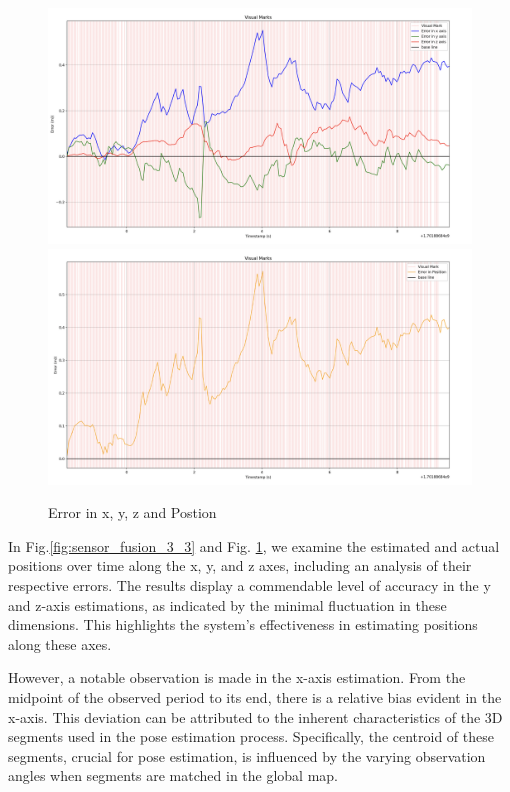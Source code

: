 \begin{figure}[H]
    \centering
    \includegraphics[width=.8\linewidth]{Pictures/sensor_fusion/Screenshot 2024-01-14 at 23.12.24.png}\hfill
    \includegraphics[width=.8\linewidth]{Pictures/sensor_fusion/Screenshot 2024-01-14 at 23.12.31.png}
    \caption{Error in x, y, z and Postion}
    \label{fig:sensor_fusion_3_4}
\end{figure}

In Fig.\ref{fig:sensor_fusion_3_3} and Fig. \ref{fig:sensor_fusion_3_4}, we examine the estimated and actual positions over time along the x, y, and z axes, including an analysis of their respective errors. The results display a commendable level of accuracy in the y and z-axis estimations, as indicated by the minimal fluctuation in these dimensions. This highlights the system's effectiveness in estimating positions along these axes.

However, a notable observation is made in the x-axis estimation. From the midpoint of the observed period to its end, there is a relative bias evident in the x-axis. This deviation can be attributed to the inherent characteristics of the 3D segments used in the pose estimation process. Specifically, the centroid of these segments, crucial for pose estimation, is influenced by the varying observation angles when segments are matched in the global map. 

